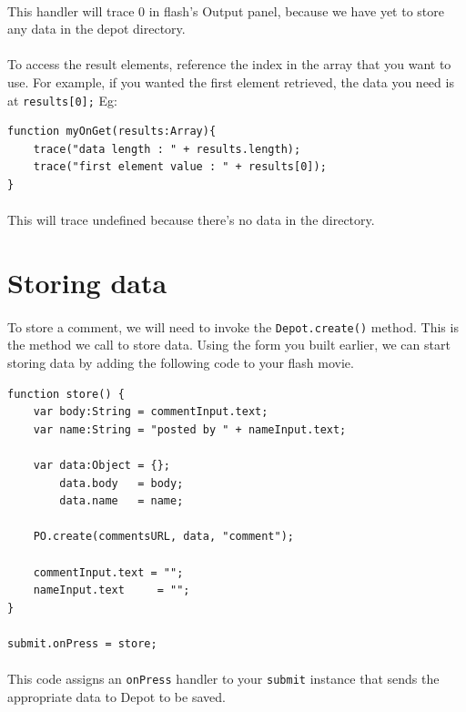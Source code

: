 \documentclass[12pt]{report}
\begin{document}
\paragraph{}
This handler will trace 0 in flash's Output panel, because we have yet
to store any data in the depot directory.

\paragraph{}
To access the result elements, reference the index in the array that
you want to use. For example, if you wanted the first element
retrieved, the data you need is at \texttt{results[0];} Eg:

\begin{Verbatim}[frame=single]
function myOnGet(results:Array){
	trace("data length : " + results.length);
	trace("first element value : " + results[0]);
}
\end{Verbatim}

\paragraph{}
This will trace undefined because there's no data in the directory.

\section{Storing data}
\paragraph{}
To store a comment, we will need to invoke the \texttt{Depot.create()}
method. This is the method we call to store data. Using the form you
built earlier, we can start storing data by adding the following code
to your flash movie.

\begin{Verbatim}[frame=single]
function store() {
	var body:String = commentInput.text;
	var name:String = "posted by " + nameInput.text;

	var data:Object = {};
	    data.body   = body;
	    data.name   = name;
	
	PO.create(commentsURL, data, "comment");
	
	commentInput.text = "";
	nameInput.text     = "";
}

submit.onPress = store;
\end{Verbatim}

\paragraph{}
This code assigns an \texttt{onPress} handler to your
\texttt{submit} instance that sends the appropriate data to Depot
to be saved.
\end{document}
